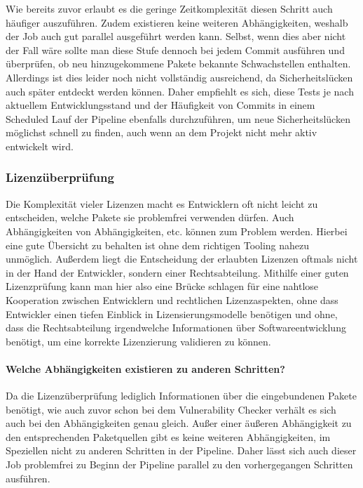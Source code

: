 Wie bereits zuvor erlaubt es die geringe Zeitkomplexität diesen Schritt auch häufiger auszuführen.
Zudem existieren keine weiteren Abhängigkeiten, weshalb der Job auch gut parallel ausgeführt werden kann.
Selbst, wenn dies aber nicht der Fall wäre sollte man diese Stufe dennoch bei jedem Commit ausführen und überprüfen, ob neu hinzugekommene Pakete bekannte Schwachstellen enthalten.
Allerdings ist dies leider noch nicht vollständig ausreichend, da Sicherheitslücken auch später entdeckt werden können.
Daher empfiehlt es sich, diese Tests je nach aktuellem Entwicklungsstand und der Häufigkeit von Commits in einem Scheduled Lauf der Pipeline ebenfalls durchzuführen, um neue Sicherheitslücken möglichst schnell zu finden, auch wenn an dem Projekt nicht mehr aktiv entwickelt wird.

\subsubsection{Lizenzüberprüfung}

Die Komplexität vieler Lizenzen macht es Entwicklern oft nicht leicht zu entscheiden, welche Pakete sie problemfrei verwenden dürfen.
Auch Abhängigkeiten von Abhängigkeiten, etc. können zum Problem werden.
Hierbei eine gute Übersicht zu behalten ist ohne dem richtigen Tooling nahezu unmöglich.
Außerdem liegt die Entscheidung der erlaubten Lizenzen oftmals nicht in der Hand der Entwickler, sondern einer Rechtsabteilung.
Mithilfe einer guten Lizenzprüfung kann man hier also eine Brücke schlagen für eine nahtlose Kooperation zwischen Entwicklern und rechtlichen Lizenzaspekten, ohne dass Entwickler einen tiefen Einblick in Lizensierungsmodelle benötigen und ohne, dass die Rechtsabteilung irgendwelche Informationen über Softwareentwicklung benötigt, um eine korrekte Lizenzierung validieren zu können.

\paragraph{Welche Abhängigkeiten existieren zu anderen Schritten?}

Da die Lizenzüberprüfung lediglich Informationen über die eingebundenen Pakete benötigt, wie auch zuvor schon bei dem Vulnerability Checker verhält es sich auch bei den Abhängigkeiten genau gleich.
Außer einer äußeren Abhängigkeit zu den entsprechenden Paketquellen gibt es keine weiteren Abhängigkeiten, im Speziellen nicht zu anderen Schritten in der Pipeline.
Daher lässt sich auch dieser Job problemfrei zu Beginn der Pipeline parallel zu den vorhergegangen Schritten ausführen.

